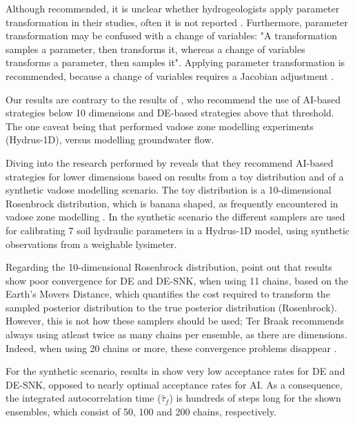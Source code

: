 Although recommended, it is unclear whether hydrogeologists apply parameter transformation in their studies, often it is not reported \citep{vrugt2009accelerating, laloy2012high}. %
Furthermore, parameter transformation may be confused with a change of variables: "A transformation samples a parameter, then transforms it, whereas a change of variables transforms a parameter, then samples it". Applying parameter transformation is recommended, because a change of variables requires a Jacobian adjustment \citep{stan_reparameterization}. 

Our results are contrary to the results of \cite{brunetti2023depth}, who recommend the use of AI-based strategies below 10 dimensions and DE-based strategies above that threshold. The one caveat being that \cite{brunetti2023depth} performed vadose zone modelling experiments (Hydrus-1D), versus modelling groundwater flow. 

Diving into the research performed by \cite{brunetti2023depth} reveals that they  recommend AI-based strategies for lower dimensions based on results from a toy distribution and of a synthetic vadose modelling scenario. The toy distribution is a 10-dimensional Rosenbrock distribution, which is banana shaped, as frequently encountered in vadose zone modelling \cite{brunetti2023depth}. In the synthetic scenario the different samplers are used for calibrating 7 soil hydraulic parameters in a Hydrus-1D model, using synthetic observations from a weighable lysimeter.

Regarding the 10-dimensional Rosenbrock distribution, \cite{brunetti2023depth} point out that results show poor convergence for DE and DE-SNK, when using 11 chains, based on the Earth's Movers Distance, which quantifies the cost required to transform the sampled posterior distribution to the true posterior distribution (Rosenbrock). However, this is not how these samplers should be used; Ter Braak recommends always using atleast twice as many chains per ensemble, as there are dimensions. Indeed, when using 20 chains or more, these convergence problems disappear \citep{brunetti2023depth}. %

For the synthetic scenario, results in \cite{brunetti2023depth} show very low acceptance rates for DE and DE-SNK, opposed to nearly optimal acceptance rates for AI. As a consequence, the integrated autocorrelation time ($\hat{\tau}_f$) is hundreds of steps long for the shown ensembles, which consist of 50, 100 and 200 chains, respectively. %

